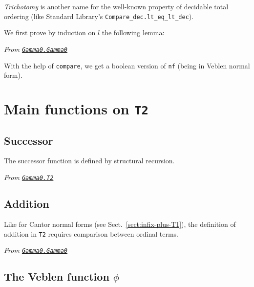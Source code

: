 \emph{Trichotomy} is another name for the well-known property of decidable total ordering (like Standard Library's \texttt{Compare\_dec.lt\_eq\_lt\_dec}).

We first prove by induction on $l$ the following lemma:

\vspace{4pt}

\noindent\emph{From \href{../theories/html/hydras.Gamma0.Gamma0\#tricho_aux}%
{\texttt{Gamma0.Gamma0}}}






With the help of \texttt{compare}, we get a boolean version of \texttt{nf}
(being in Veblen normal form).







\section{Main functions on \texttt{T2}}

\subsection{Successor}
The successor function is defined by structural recursion.

\noindent\emph{From \href{../theories/html/hydras.Gamma0.T2.html\#succ}%
{\texttt{Gamma0.T2}}}




\subsection{Addition}

Like for Cantor normal forms (see Sect.~\ref{sect:infix-plus-T1}),  the definition of addition in \texttt{T2}  requires comparison between ordinal terms.

\noindent\emph{From \href{../theories/html/hydras.Gamma0.Gamma0T2.html\#succ}%
  {\texttt{Gamma0.Gamma0}}}





\subsection{The Veblen function \texorpdfstring{$\phi$}{\texttt{phi}}}

